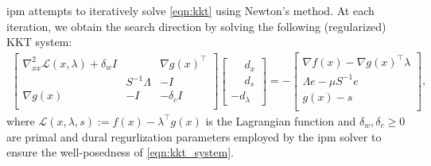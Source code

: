 \documentclass{article}
\begin{document}
\Gls*{ipm} attempts to iteratively solve \cref{eqn:kkt} using Newton's method. At each iteration, we obtain the
search direction by solving the following (regularized) KKT system:
\begin{align}\label{eqn:kkt_system}
  \begin{bmatrix}
    \nabla^2_{x x} \mathcal{L}(x,\lambda) + \delta_w I&& \nabla g(x)^\top  \\
                                          & S^{-1}\Lambda & -I \\
    \nabla g(x) & -I &  - \delta_c I\\
  \end{bmatrix}
  \begin{bmatrix}
    \phantom{-}d_x\\
    \phantom{-}d_s \\
    -d_\lambda
  \end{bmatrix} =
  -\begin{bmatrix}
    \nabla f(x) - \nabla g(x)^\top \lambda\\
    \Lambda e - \mu S^{-1} e \\
    g(x) - s\\
  \end{bmatrix},
\end{align}
where $\mathcal{L}(x,\lambda,s)  := f(x) - \lambda^\top g(x)$ is the Lagrangian function and $\delta_w,\delta_c\geq 0$ are primal and dural regurlization parameters employed by the \gls*{ipm} solver to ensure the well-posedness of \cref{eqn:kkt_system}.
\end{document}

